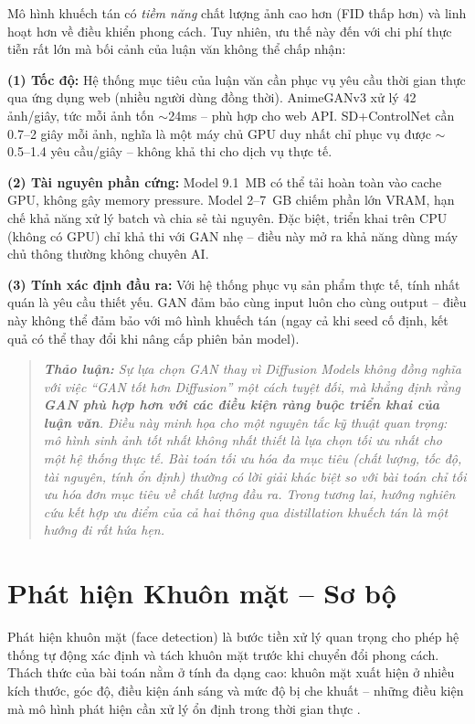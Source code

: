Mô hình khuếch tán có \textit{tiềm năng} chất lượng ảnh cao hơn (FID thấp hơn) và linh hoạt hơn về điều khiển phong cách. Tuy nhiên, ưu thế này đến với chi phí thực tiễn rất lớn mà bối cảnh của luận văn không thể chấp nhận:

\textbf{(1) Tốc độ:} Hệ thống mục tiêu của luận văn cần phục vụ yêu cầu thời gian thực qua ứng dụng web (nhiều người dùng đồng thời). AnimeGANv3 xử lý 42 ảnh/giây, tức mỗi ảnh tốn $\sim$24ms -- phù hợp cho web API. SD+ControlNet cần 0.7--2 giây mỗi ảnh, nghĩa là một máy chủ GPU duy nhất chỉ phục vụ được $\sim$0.5--1.4 yêu cầu/giây -- không khả thi cho dịch vụ thực tế.

\textbf{(2) Tài nguyên phần cứng:} Model 9.1~MB có thể tải hoàn toàn vào cache GPU, không gây memory pressure. Model 2--7~GB chiếm phần lớn VRAM, hạn chế khả năng xử lý batch và chia sẻ tài nguyên. Đặc biệt, triển khai trên CPU (không có GPU) chỉ khả thi với GAN nhẹ -- điều này mở ra khả năng dùng máy chủ thông thường không chuyên AI.

\textbf{(3) Tính xác định đầu ra:} Với hệ thống phục vụ sản phẩm thực tế, tính nhất quán là yêu cầu thiết yếu. GAN đảm bảo cùng input luôn cho cùng output -- điều này không thể đảm bảo với mô hình khuếch tán (ngay cả khi seed cố định, kết quả có thể thay đổi khi nâng cấp phiên bản model).

\begin{quote}
\textit{\textbf{Thảo luận:} Sự lựa chọn GAN thay vì Diffusion Models không đồng nghĩa với việc ``GAN tốt hơn Diffusion'' một cách tuyệt đối, mà khẳng định rằng \textbf{GAN phù hợp hơn với các điều kiện ràng buộc triển khai của luận văn}. Điều này minh họa cho một nguyên tắc kỹ thuật quan trọng: mô hình sinh ảnh tốt nhất không nhất thiết là lựa chọn tối ưu nhất cho một hệ thống thực tế. Bài toán tối ưu hóa đa mục tiêu (chất lượng, tốc độ, tài nguyên, tính ổn định) thường có lời giải khác biệt so với bài toán chỉ tối ưu hóa đơn mục tiêu về chất lượng đầu ra. Trong tương lai, hướng nghiên cứu kết hợp ưu điểm của cả hai thông qua distillation khuếch tán \cite{Ho2020} là một hướng đi rất hứa hẹn.}
\end{quote}

\section{Phát hiện Khuôn mặt -- Sơ bộ}
\label{sec:face_detection_overview}

Phát hiện khuôn mặt (face detection) là bước tiền xử lý quan trọng cho phép hệ thống tự động xác định và tách khuôn mặt trước khi chuyển đổi phong cách. Thách thức của bài toán nằm ở tính đa dạng cao: khuôn mặt xuất hiện ở nhiều kích thước, góc độ, điều kiện ánh sáng và mức độ bị che khuất -- những điều kiện mà mô hình phát hiện cần xử lý ổn định trong thời gian thực \cite{ViolaJones2004}.

